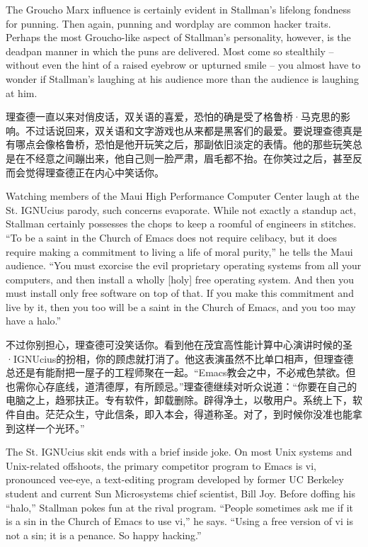 \ifdefined\eng
The Groucho Marx influence is certainly evident in Stallman's lifelong fondness for punning. Then again, punning and wordplay are common hacker traits. Perhaps the most Groucho-like aspect of Stallman's personality, however, is the deadpan manner in which the puns are delivered. Most come so stealthily -- without even the hint of a raised eyebrow or upturned smile -- you almost have to wonder if Stallman's laughing at his audience more than the audience is laughing at him.
\fi

\ifdefined\chs
理查德一直以来对俏皮话，双关语的喜爱，恐怕的确是受了格鲁桥·马克思的影响。不过话说回来，双关语和文字游戏也从来都是黑客们的最爱。要说理查德真是有哪点会像格鲁桥，恐怕是他开玩笑之后，那副依旧淡定的表情。他的那些玩笑总是在不经意之间蹦出来，他自己则一脸严肃，眉毛都不抬。在你笑过之后，甚至反而会觉得理查德正在内心中笑话你。
\fi

\ifdefined\eng
Watching members of the Maui High Performance Computer Center laugh at the St. IGNUcius parody, such concerns evaporate. While not exactly a standup act, Stallman certainly possesses the chops to keep a roomful of engineers in stitches. ``To be a saint in the Church of Emacs does not require celibacy, but it does require making a commitment to living a life of moral purity,'' he tells the Maui audience. ``You must exorcise the evil proprietary operating systems from all your computers, and then install a wholly [holy] free operating system. And then you must install only free software on top of that. If you make this commitment and live by it, then you too will be a saint in the Church of Emacs, and you too may have a halo.''
\fi

\ifdefined\chs
不过你别担心，理查德可没笑话你。看到他在茂宜高性能计算中心演讲时候的圣·IGNUcius的扮相，你的顾虑就打消了。他这表演虽然不比单口相声，但理查德总还是有能耐把一屋子的工程师聚在一起。“Emacs教会之中，不必戒色禁欲。但也需你心存底线，道清德厚，有所顾忌。”理查德继续对听众说道：“你要在自己的电脑之上，趋邪扶正。专有软件，卸载删除。辟得净土，以敬用户。系统上下，软件自由。茫茫众生，守此信条，即入本会，得道称圣。对了，到时候你没准也能拿到这样一个光环。”
\fi

\ifdefined\eng
The St. IGNUcius skit ends with a brief inside joke. On most Unix systems and Unix-related offshoots, the primary competitor program to Emacs is vi, pronounced vee-eye, a text-editing program developed by former UC Berkeley student and current Sun Microsystems chief scientist, Bill Joy. Before doffing his ``halo,'' Stallman pokes fun at the rival program. ``People sometimes ask me if it is a sin in the Church of Emacs to use vi,'' he says. ``Using a free version of vi is not a sin; it is a penance. So happy hacking.''
\fi

